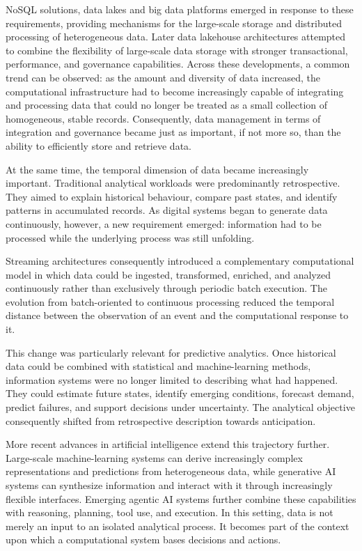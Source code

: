 NoSQL solutions, data lakes and big data platforms emerged in response to these requirements, providing mechanisms for the large-scale storage and distributed processing of heterogeneous data. Later data lakehouse architectures attempted to combine the flexibility of large-scale data storage with stronger transactional, performance, and governance capabilities. Across these developments, a common trend can be observed: as the amount and diversity of data increased, the computational infrastructure had to become increasingly capable of integrating and processing data that could no longer be treated as a small collection of homogeneous, stable records. Consequently, data management in terms of integration and governance became just as important, if not more so, than the ability to efficiently store and retrieve data.

At the same time, the temporal dimension of data became increasingly important. Traditional analytical workloads were predominantly retrospective. They aimed to explain historical behaviour, compare past states, and identify patterns in accumulated records. As digital systems began to generate data continuously, however, a new requirement emerged: information had to be processed while the underlying process was still unfolding.

Streaming architectures consequently introduced a complementary computational model in which data could be ingested, transformed, enriched, and analyzed continuously rather than exclusively through periodic batch execution. The evolution from batch-oriented to continuous processing reduced the temporal distance between the observation of an event and the computational response to it.

This change was particularly relevant for predictive analytics. Once historical data could be combined with statistical and machine-learning methods, information systems were no longer limited to describing what had happened. They could estimate future states, identify emerging conditions, forecast demand, predict failures, and support decisions under uncertainty. The analytical objective consequently shifted from retrospective description towards anticipation.

More recent advances in artificial intelligence extend this trajectory further. Large-scale machine-learning systems can derive increasingly complex representations and predictions from heterogeneous data, while generative AI systems can synthesize information and interact with it through increasingly flexible interfaces. Emerging agentic AI systems further combine these capabilities with reasoning, planning, tool use, and execution. In this setting, data is not merely an input to an isolated analytical process. It becomes part of the context upon which a computational system bases decisions and actions.

